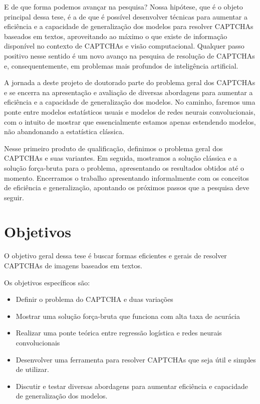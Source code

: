 \documentclass[12pt,]{report}
\providecommand{\tightlist}{%
  \setlength{\itemsep}{0pt}\setlength{\parskip}{0pt}}
\begin{document}
E de que forma podemos avançar na pesquisa? Nossa hipótese, que é o
objeto principal dessa tese, é a de que é possível desenvolver técnicas
para aumentar a eficiência e a capacidade de generalização dos modelos
para resolver CAPTCHAs baseados em textos, aproveitando ao máximo o que
existe de informação disponível no contexto de CAPTCHAs e visão
computacional. Qualquer passo positivo nesse sentido é um novo avanço na
pesquisa de resolução de CAPTCHAs e, consequentemente, em problemas mais
profundos de inteligência artificial.

A jornada a deste projeto de doutorado parte do problema geral dos
CAPTCHAs e se encerra na apresentação e avaliação de diversas abordagens
para aumentar a eficiência e a capacidade de generalização dos modelos.
No caminho, faremos uma ponte entre modelos estatísticos usuais e
modelos de redes neurais convolucionais, com o intuito de mostrar que
essencialmente estamos apenas estendendo modelos, não abandonando a
estatística clássica.

Nesse primeiro produto de qualificação, definimos o problema geral dos
CAPTCHAs e suas variantes. Em seguida, mostramos a solução clássica e a
solução força-bruta para o problema, apresentando os resultados obtidos
até o momento. Encerramos o trabalho apresentando informalmente com os
conceitos de eficiência e generalização, apontando os próximos passos
que a pesquisa deve seguir.

\section{Objetivos}\label{objetivos}

O objetivo geral dessa tese é buscar formas eficientes e gerais de
resolver CAPTCHAs de imagens baseados em textos.

Os objetivos específicos são:

\begin{itemize}
\tightlist
\item
  Definir o problema do CAPTCHA e duas variações
\item
  Mostrar uma solução força-bruta que funciona com alta taxa de acurácia
\item
  Realizar uma ponte teórica entre regressão logística e redes neurais
  convolucionais
\item
  Desenvolver uma ferramenta para resolver CAPTCHAs que seja útil e
  simples de utilizar.
\item
  Discutir e testar diversas abordagens para aumentar eficiência e
  capacidade de generalização dos modelos.
\end{itemize}
\end{document}
